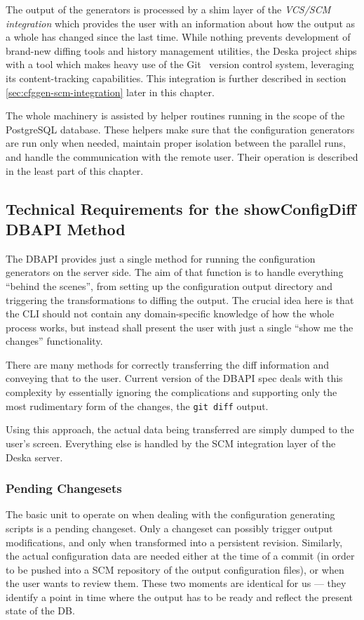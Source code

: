 \documentclass[deska]{subfiles}
\begin{document}
The output of the generators is processed by a shim layer of the {\em VCS/SCM integration} which provides the user with
an information about how the output as a whole has changed since the last time.  While nothing prevents development of
brand-new diffing tools and history management utilities, the Deska project ships with a tool which makes heavy use of
the Git~\cite{git} version control system, leveraging its content-tracking capabilities.  This integration is further
described in section \ref{sec:cfggen-scm-integration} later in this chapter.

The whole machinery is assisted by helper routines running in the scope of the PostgreSQL database.  These helpers make
sure that the configuration generators are run only when needed, maintain proper isolation between the parallel runs,
and handle the communication with the remote user.  Their operation is described in the least part of this chapter.

\subsection{Technical Requirements for the showConfigDiff DBAPI Method}

The DBAPI provides just a single method for running the configuration generators on the server side.  The aim of that
function is to handle everything ``behind the scenes'', from setting up the configuration output directory and
triggering the transformations to diffing the output.  The crucial idea here is that the CLI should not contain any
domain-specific knowledge of how the whole process works, but instead shall present the user with just a single ``show
me the changes'' functionality.

There are many methods for correctly transferring the diff information and conveying that to the user.  Current version
of the DBAPI spec deals with this complexity by essentially ignoring the complications and supporting only the most
rudimentary form of the changes, the {\tt git diff} output.

Using this approach, the actual data being transferred are simply dumped to the user's screen.  Everything else is
handled by the SCM integration layer of the Deska server.

\subsubsection{Pending Changesets}

The basic unit to operate on when dealing with the configuration generating scripts is a pending changeset.  Only a
changeset can possibly trigger output modifications, and only when transformed into a persistent revision.  Similarly,
the actual configuration data are needed either at the time of a commit (in order to be pushed into a SCM repository of
the output configuration files), or when the user wants to review them.  These two moments are identical for us --- they
identify a point in time where the output has to be ready and reflect the present state of the DB.
\end{document}
